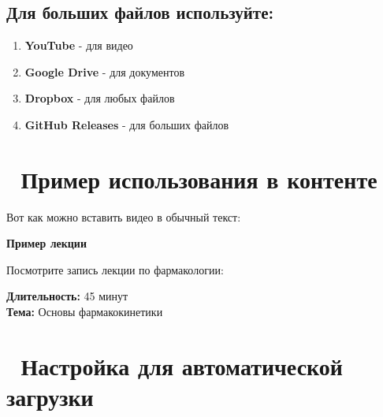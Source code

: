 \documentclass[
  russian,
  12pt,
  a4paper,
]{article}
\providecommand{\tightlist}{%
  \setlength{\itemsep}{0pt}\setlength{\parskip}{0pt}}
\begin{document}
\subsection{Для больших файлов
используйте:}\label{ux434ux43bux44f-ux431ux43eux43bux44cux448ux438ux445-ux444ux430ux439ux43bux43eux432-ux438ux441ux43fux43eux43bux44cux437ux443ux439ux442ux435}

\begin{enumerate}
\def\labelenumi{\arabic{enumi}.}
\tightlist
\item
  \textbf{YouTube} - для видео
\item
  \textbf{Google Drive} - для документов
\item
  \textbf{Dropbox} - для любых файлов
\item
  \textbf{GitHub Releases} - для больших файлов
\end{enumerate}

\section{📝 Пример использования в
контенте}\label{ux43fux440ux438ux43cux435ux440-ux438ux441ux43fux43eux43bux44cux437ux43eux432ux430ux43dux438ux44f-ux432-ux43aux43eux43dux442ux435ux43dux442ux435}

Вот как можно вставить видео в обычный текст:

\begin{tcolorbox}[enhanced jigsaw, breakable, toprule=.15mm, colback=white, opacityback=0, rightrule=.15mm, leftrule=.75mm, arc=.35mm, bottomrule=.15mm, colframe=quarto-callout-note-color-frame, left=2mm]

\vspace{-3mm}\textbf{Пример лекции}\vspace{3mm}

Посмотрите запись лекции по фармакологии:

\textbf{Длительность:} 45 минут\\
\textbf{Тема:} Основы фармакокинетики

\end{tcolorbox}

\section{🔧 Настройка для автоматической
загрузки}\label{ux43dux430ux441ux442ux440ux43eux439ux43aux430-ux434ux43bux44f-ux430ux432ux442ux43eux43cux430ux442ux438ux447ux435ux441ux43aux43eux439-ux437ux430ux433ux440ux443ux437ux43aux438}
\end{document}
